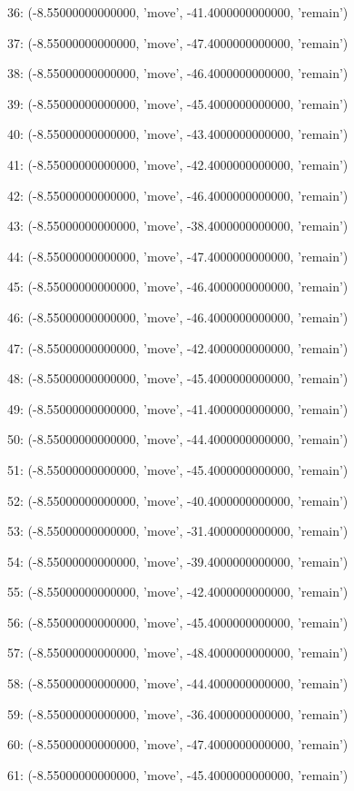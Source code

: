36: (-8.55000000000000, 'move', -41.4000000000000, 'remain')


37: (-8.55000000000000, 'move', -47.4000000000000, 'remain')


38: (-8.55000000000000, 'move', -46.4000000000000, 'remain')


39: (-8.55000000000000, 'move', -45.4000000000000, 'remain')


40: (-8.55000000000000, 'move', -43.4000000000000, 'remain')


41: (-8.55000000000000, 'move', -42.4000000000000, 'remain')


42: (-8.55000000000000, 'move', -46.4000000000000, 'remain')


43: (-8.55000000000000, 'move', -38.4000000000000, 'remain')


44: (-8.55000000000000, 'move', -47.4000000000000, 'remain')


45: (-8.55000000000000, 'move', -46.4000000000000, 'remain')


46: (-8.55000000000000, 'move', -46.4000000000000, 'remain')


47: (-8.55000000000000, 'move', -42.4000000000000, 'remain')


48: (-8.55000000000000, 'move', -45.4000000000000, 'remain')


49: (-8.55000000000000, 'move', -41.4000000000000, 'remain')


50: (-8.55000000000000, 'move', -44.4000000000000, 'remain')


51: (-8.55000000000000, 'move', -45.4000000000000, 'remain')


52: (-8.55000000000000, 'move', -40.4000000000000, 'remain')


53: (-8.55000000000000, 'move', -31.4000000000000, 'remain')


54: (-8.55000000000000, 'move', -39.4000000000000, 'remain')


55: (-8.55000000000000, 'move', -42.4000000000000, 'remain')


56: (-8.55000000000000, 'move', -45.4000000000000, 'remain')


57: (-8.55000000000000, 'move', -48.4000000000000, 'remain')


58: (-8.55000000000000, 'move', -44.4000000000000, 'remain')


59: (-8.55000000000000, 'move', -36.4000000000000, 'remain')


60: (-8.55000000000000, 'move', -47.4000000000000, 'remain')


61: (-8.55000000000000, 'move', -45.4000000000000, 'remain')


